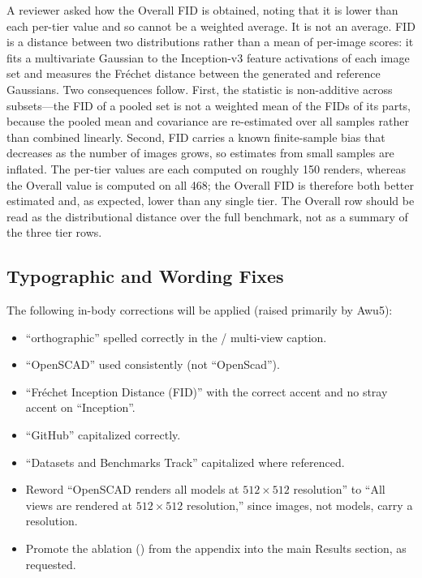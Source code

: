 A reviewer asked how the Overall FID is obtained, noting that it is lower than each per-tier value and so cannot be a weighted average. It is not an average. FID is a distance between two distributions rather than a mean of per-image scores: it fits a multivariate Gaussian to the Inception-v3 feature activations of each image set and measures the Fr\'echet distance between the generated and reference Gaussians. Two consequences follow. First, the statistic is non-additive across subsets---the FID of a pooled set is not a weighted mean of the FIDs of its parts, because the pooled mean and covariance are re-estimated over all samples rather than combined linearly. Second, FID carries a known finite-sample bias that decreases as the number of images grows, so estimates from small samples are inflated. The per-tier values are each computed on roughly 150 renders, whereas the Overall value is computed on all 468; the Overall FID is therefore both better estimated and, as expected, lower than any single tier. The Overall row should be read as the distributional distance over the full benchmark, not as a summary of the three tier rows.

\subsection{Typographic and Wording Fixes}
\label{subsec:typos}

The following in-body corrections will be applied (raised primarily by Awu5):
\begin{itemize}[topsep=2pt,itemsep=1pt]
\item ``orthographic'' spelled correctly in the  / multi-view caption.
\item ``OpenSCAD'' used consistently (not ``OpenScad'').
\item ``Fr\'echet Inception Distance (FID)'' with the correct accent and no stray accent on ``Inception''.
\item ``GitHub'' capitalized correctly.
\item ``Datasets and Benchmarks Track'' capitalized where referenced.
\item Reword ``OpenSCAD renders all models at $512\times512$ resolution'' to ``All views are rendered at $512\times512$ resolution,'' since images, not models, carry a resolution.
\item Promote the ablation () from the appendix into the main Results section, as requested.
\end{itemize}


